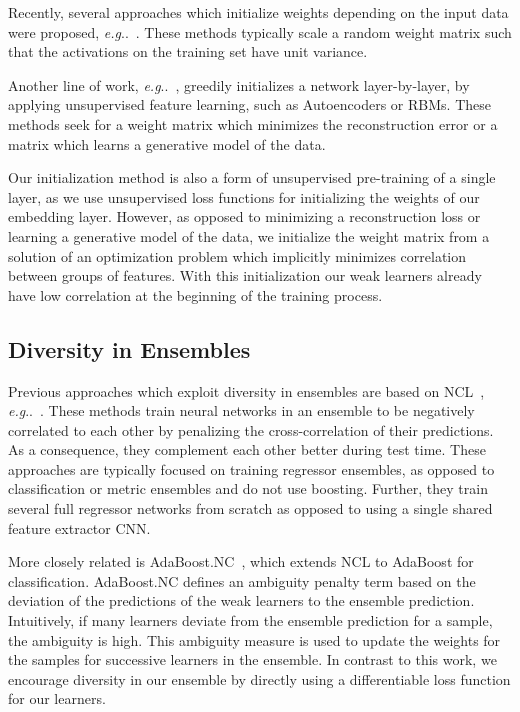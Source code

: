\documentclass[10pt,journal,compsoc]{IEEEtran}
\makeatletter
\DeclareRobustCommand\onedot{\futurelet\@let@token\@onedot}
\def\@onedot{\ifx\@let@token.\else.\null\fi\xspace}
\def\eg{\emph{e.g}\onedot} \def\Eg{\emph{E.g}\onedot}
\makeatother
\begin{document}
Recently, several approaches which initialize weights depending on
the input data were proposed, \eg~\cite{krahenbuhl2015data, mishkin2016all}. These methods
typically scale a random weight matrix such that the activations on the training set have 
unit variance.

Another line of work, \eg~\cite{bengio2006greedy, hinton2006fast}, 
greedily initializes a network layer-by-layer, by applying unsupervised
feature learning, such as Autoencoders or \acp{RBM}.
These methods seek for a weight matrix which minimizes the reconstruction error or a matrix which
learns a generative model of the data.

Our initialization method is also a form of unsupervised pre-training of a single layer, as 
we use unsupervised loss functions for initializing the weights of our embedding layer.
However, as opposed to minimizing a reconstruction loss or learning a generative model of the data,
we initialize the weight matrix from a solution of an
optimization problem which implicitly minimizes correlation between groups of features.
With this initialization our weak learners already have low correlation at the beginning
of the training process.

\subsection{Diversity in Ensembles}\label{sec:related-work-diversity}

Previous approaches which exploit diversity in ensembles are based on
\ac{NCL}~\cite{liu1999ensemble}, \eg~\cite{liu1999ensemble,chen2010multiobjective}. These methods train neural networks in an ensemble to be
negatively correlated to each other by penalizing the cross-correlation of their predictions. As a consequence,
they complement each other better during test time. These approaches are typically focused on 
training regressor ensembles, as opposed to classification or metric ensembles and do not use boosting. Further, they train several full 
regressor networks from scratch as opposed to using a single shared feature extractor \ac{CNN}.

More closely related is AdaBoost.NC~\cite{wang2010negative}, which extends \ac{NCL} to AdaBoost for classification. AdaBoost.NC
defines an ambiguity penalty term based on the deviation of the predictions of the weak learners to the ensemble
prediction. Intuitively, if many learners deviate from the ensemble prediction for a sample, the ambiguity is high.
This ambiguity measure is used to update the weights for the samples for successive learners in the ensemble.
In contrast to this work, we encourage diversity in our ensemble by directly using a differentiable loss function for our learners.
\end{document}
